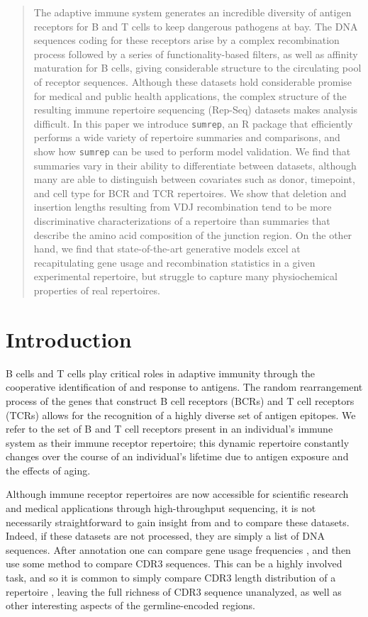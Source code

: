 \documentclass{article}
\begin{document}
\begin{abstract}
The adaptive immune system generates an incredible diversity of antigen receptors for B and T cells to keep dangerous pathogens at bay.
The DNA sequences coding for these receptors arise by a complex recombination process followed by a series of functionality-based filters, as well as affinity maturation for B cells, giving considerable structure to the circulating pool of receptor sequences.
Although these datasets hold considerable promise for medical and public health applications, the complex structure of the resulting immune repertoire sequencing (Rep-Seq) datasets makes analysis difficult.
In this paper we introduce \texttt{sumrep}, an R package that efficiently performs a wide variety of repertoire summaries and comparisons, and show how \texttt{sumrep} can be used to perform model validation.
We find that summaries vary in their ability to differentiate between datasets, although many are able to distinguish between covariates such as donor, timepoint, and cell type for BCR and TCR repertoires.
We show that deletion and insertion lengths resulting from VDJ recombination tend to be more discriminative characterizations of a repertoire than summaries that describe the amino acid composition of the junction region.
On the other hand, we find that state-of-the-art generative models excel at recapitulating gene usage and recombination statistics in a given experimental repertoire, but struggle to capture many physiochemical properties of real repertoires.
\end{abstract}


\section*{Introduction}

B cells and T cells play critical roles in adaptive immunity through the cooperative identification of and response to antigens.
The random rearrangement process of the genes that construct B cell receptors (BCRs) and T cell receptors (TCRs) allows for the recognition of a highly diverse set of antigen epitopes.
We refer to the set of B and T cell receptors present in an individual's immune system as their immune receptor repertoire; this dynamic repertoire constantly changes over the course of an individual's lifetime due to antigen exposure and the effects of aging.

Although immune receptor repertoires are now accessible for scientific research and medical applications through high-throughput sequencing, it is not necessarily straightforward to gain insight from and to compare these datasets.
Indeed, if these datasets are not processed, they are simply a list of DNA sequences.
After annotation one can compare gene usage frequencies \cite{Hou2016-qc, Martin2015-ho, Corcoran2016-nw, Gadala2015-wq, Boyd2010-hd, Bolen2017-xt}, and then use some method to compare CDR3 sequences.
This can be a highly involved task, and so it is common to simply compare CDR3 length distribution of a repertoire \cite{Miqueu2007-lk,Larimore2012-lo}, leaving the full richness of CDR3 sequence unanalyzed, as well as other interesting aspects of the germline-encoded regions.
\end{document}

